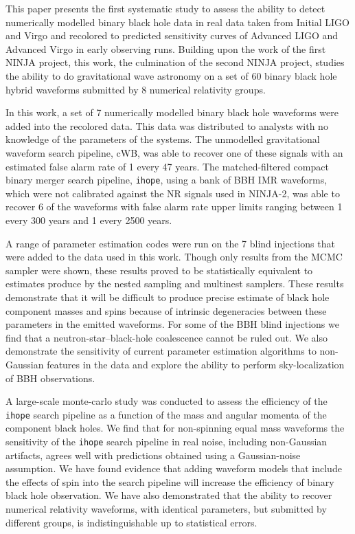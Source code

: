 \documentclass[12pt]{iopart}
\newcommand{\ihope}{\texttt{ihope}}
\begin{document}
This paper presents the first systematic study to assess the ability to 
detect numerically modelled binary black hole data in real data taken from 
Initial LIGO and Virgo and recolored to predicted sensitivity curves of 
Advanced LIGO and Advanced Virgo in early observing runs. Building upon the 
work of the first NINJA project, this work, the culmination of the second NINJA 
project, studies the ability to do gravitational wave astronomy on a set of 60 
binary black hole hybrid waveforms submitted by 8 numerical relativity groups. 

In this work, a set of 7 numerically modelled binary black hole waveforms were 
added into the recolored data. This data was distributed to analysts with no 
knowledge of the parameters of the systems. The unmodelled gravitational 
waveform search pipeline, cWB, was able to recover one of these signals with an 
estimated false alarm rate of 1 every 47 years. The matched-filtered compact 
binary merger search pipeline, \ihope{}, using a bank of BBH IMR waveforms, 
which were not calibrated against the NR signals used in NINJA-2, was able 
to recover 6 of the waveforms with false alarm rate upper limits ranging 
between 
1 every 300 years and 1 every 2500 years. 

A range of parameter estimation codes were run on the 7 blind injections 
that were added to the data used in this work. Though only results from
the MCMC sampler were shown, these results proved to be statistically
equivalent to estimates produce by the nested sampling and multinest
samplers. These results demonstrate that it will be difficult to produce 
precise estimate of black hole component masses and spins because of intrinsic 
degeneracies between these parameters in the emitted waveforms. For some of the 
BBH blind injections we find that a neutron-star--black-hole coalescence cannot 
be ruled out. We also demonstrate the sensitivity of current parameter 
estimation algorithms to non-Gaussian features in the data and explore the 
ability to perform sky-localization of BBH observations.

A large-scale monte-carlo study was conducted to assess the efficiency of the 
\ihope{} search pipeline as a function of the mass and angular momenta of the 
component black holes. We find that for non-spinning equal mass waveforms the 
sensitivity of the \ihope{} search pipeline in real noise, including 
non-Gaussian artifacts, agrees well with predictions obtained using a 
Gaussian-noise assumption. We have found evidence that adding waveform models 
that include the effects of spin into the search pipeline will increase the 
efficiency of binary black hole observation. We have also demonstrated that the 
ability to recover numerical relativity waveforms, with identical parameters, 
but submitted by different groups, is indistinguishable up to statistical 
errors.
\end{document}
